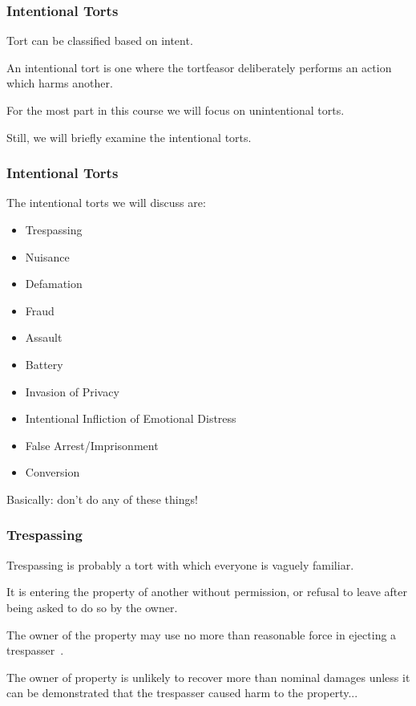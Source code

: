 \begin{frame}
\frametitle{Intentional Torts}

Tort can be classified based on intent.

An \alert{intentional tort} is one where the tortfeasor deliberately performs an action which harms another.

For the most part in this course we will focus on \alert{unintentional torts}.

Still, we will briefly examine the intentional torts.

\end{frame}



\begin{frame}
\frametitle{Intentional Torts}

The intentional torts we will discuss are:

\begin{itemize}
	\item Trespassing 
	\item Nuisance
	\item Defamation
	\item Fraud
	\item Assault
	\item Battery
	\item Invasion of Privacy
	\item Intentional Infliction of Emotional Distress
	\item False Arrest/Imprisonment
	\item Conversion
\end{itemize}

Basically: don't do any of these things!

\end{frame}



\begin{frame}
\frametitle{Trespassing}

Trespassing is probably a tort with which everyone is vaguely familiar.

It is entering the property of another without permission, or refusal to leave after being asked to do so by the owner.

The owner of the property may use no more than reasonable force in ejecting a trespasser~\cite{lba}.

The owner of property is unlikely to recover more than nominal damages unless it can be demonstrated that the trespasser caused harm to the property...

\end{frame}



